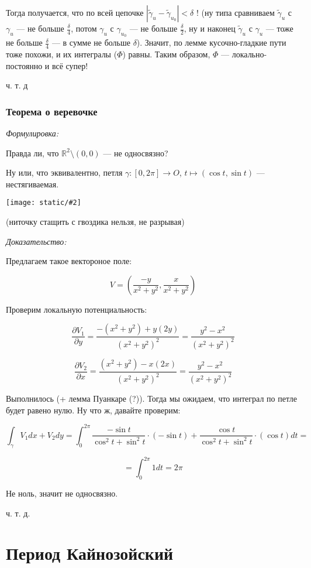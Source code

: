 \documentclass{article}
\def\images#1#2{\begin{center}\texttt{[image: static/\#2]}\end{center}}
\begin{document}
Тогда получается, что по всей цепочке $|\tilde{\gamma}_{u} - \tilde{\gamma}_{u_0}| < \delta$ ! (ну типа сравниваем $\tilde{\gamma}_{u}$ с $\gamma_{u}$ --- не больше $\frac{\delta}{4}$, потом $\gamma_{u}$ с $\gamma_{u_{0}}$ --- не больше $\frac{\delta}{2}$, ну и наконец $\tilde{\gamma}_{u}$ с $\gamma_{u}$ --- тоже не больше $\frac{\delta}{4}$ --- в сумме не больше $\delta$). Значит, по лемме кусочно-гладкие пути тоже похожи, и их интегралы ($\Phi$) равны. Таким образом, $\Phi$ --- локально-постоянно и всё супер!

ч. т. д



\subsubsection{Теорема о веревочке}
\textit{Формулировка:}

Правда ли, что $\mathbb{R}^2 \setminus (0, 0)$ --- не односвязно? 

Ну или, что эквивалентно, петля $\gamma: [0, 2\pi] \rightarrow O$, $t \mapsto (\cos t, \sin t)$ --- нестягиваемая.

\images{0.5}{lemm_o_ver.jpg}

(ниточку стащить с гвоздика нельзя, не разрывая)

\textit{Доказательство:}

Предлагаем такое вектороное поле:

\[V = \left( \frac{-y}{x^2 + y^2}, \frac{x}{x^2 + y^2}\right)\]

Проверим локальную потенциальность:

\[\frac{\partial V_1}{\partial y} = \frac{-(x^2 + y^2) + y(2y)}{(x^2 + y^2)^2} = \frac{y^2 - x^2}{(x^2 + y^2)^2}\]

\[\frac{\partial V_2}{\partial x} = \frac{(x^2 + y^2) - x(2x)}{(x^2 + y^2)^2} = \frac{y^2 - x^2}{(x^2 + y^2)^2}\]

Выполнилось (+ лемма Пуанкаре (?)). Тогда мы ожидаем, что интеграл по петле будет равено нулю. Ну что ж, давайте проверим:

\[\int_{\gamma} V_1 dx + V_2 dy = \int_{0}^{2\pi} \frac{-\sin t}{\cos^2 t + \sin^2 t} \cdot (- \sin t) + \frac{\cos t}{\cos^2 t + \sin^2 t} \cdot (\cos t) dt = \]

\[= \int_0^{2\pi} 1 dt = 2\pi\]

Не ноль, значит не односвязно. 

ч. т. д. 


\section{Период Кайнозойский}
\end{document}
